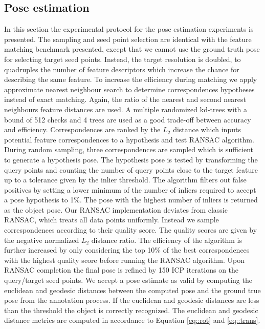 \documentclass[10pt,twocolumn,letterpaper]{article}
\begin{document}
\subsection{Pose estimation}
In this section the experimental protocol for the pose estimation experiments is presented. The sampling and seed point selection are identical with the feature matching benchmark presented, except that we cannot use the ground truth pose for selecting target seed points. Instead, the target resolution is doubled, to quadruples the number of feature descriptors which increase the chance for describing the same feature. To increase the efficiency during matching we apply approximate nearest neighbour search to determine correspondences hypotheses instead of exact matching. Again, the ratio of the nearest and second nearest neighbours feature distances are used. A multiple randomized kd-trees with a bound of 512 checks and 4 trees are used as a good trade-off between accuracy and efficiency. Correspondences are ranked by the ${L_2}$ distance which inputs potential feature correspondences to a hypothesis and test RANSAC algorithm.
During random sampling, three correspondences are sampled which is sufficient to generate a hypothesis pose. The hypothesis pose is tested by transforming the query points and counting the number of query points close to the target feature up to a tolerance given by the inlier threshold. The algorithm filters out false positives by setting a lower minimum of the number of inliers required to accept a pose hypothesis to 1\%. The pose with the highest number of inliers is returned as the object pose. Our RANSAC implementation deviates from classic RANSAC, which treats all data points uniformly. Instead we sample correspondences according to their quality score. The quality scores are given by the negative normalized ${L_2}$ distance ratio. The efficiency of the algorithm is further increased by only considering the top 10\% of the best correspondences with the highest quality score before running the RANSAC algorithm. Upon RANSAC completion the final pose is refined by 150 ICP iterations on the query/target seed points. We accept a pose estimate as valid by computing the euclidean and geodesic distances between the computed pose and the ground true pose from the annotation process. If the euclidean and geodesic distances are less than the threshold the object is correctly recognized. The euclidean and geodesic distance metrics are computed in accordance to Equation \ref{eq::rot} and \ref{eq::trans}.      
\end{document}
